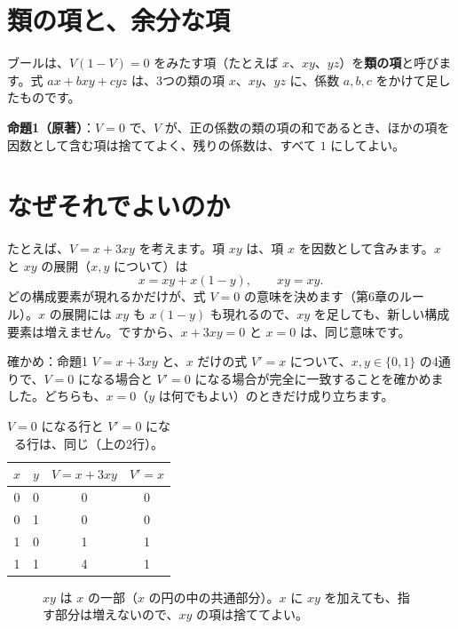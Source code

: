 \documentclass[a4paper,11pt,openany]{ltjsbook}
\begin{document}
\section{類の項と、余分な項}

ブールは、$V(1-V)=0$ をみたす項（たとえば $x$、$xy$、$yz$）を\textbf{類の項}と呼びます。式 $ax+bxy+cyz$ は、3つの類の項 $x$、$xy$、$yz$ に、係数 $a,b,c$ をかけて足したものです。

\textbf{命題1（原著）}：$V=0$ で、$V$ が、正の係数の類の項の和であるとき、ほかの項を因数として含む項は捨ててよく、残りの係数は、すべて $1$ にしてよい。

\section{なぜそれでよいのか}

たとえば、$V=x+3xy$ を考えます。項 $xy$ は、項 $x$ を因数として含みます。$x$ と $xy$ の展開（$x,y$ について）は
\[
x=xy+x(1-y),\qquad xy=xy .
\]
どの構成要素が現れるかだけが、式 $V=0$ の意味を決めます（第6章のルール）。$x$ の展開には $xy$ も $x(1-y)$ も現れるので、$xy$ を足しても、新しい構成要素は増えません。ですから、$x+3xy=0$ と $x=0$ は、同じ意味です。

\begin{examplebox}{確かめ：命題1}
$V=x+3xy$ と、$x$ だけの式 $V'=x$ について、$x,y\in\{0,1\}$ の4通りで、$V=0$ になる場合と $V'=0$ になる場合が完全に一致することを確かめました。どちらも、$x=0$（$y$ は何でもよい）のときだけ成り立ちます。
\end{examplebox}

\begin{table}[htbp]
\centering
\begin{tabular}{cc|cc}
\toprule
$x$ & $y$ & $V=x+3xy$ & $V'=x$\\
\midrule
0 & 0 & 0 & 0\\
0 & 1 & 0 & 0\\
1 & 0 & 1 & 1\\
1 & 1 & 4 & 1\\
\bottomrule
\end{tabular}
\caption{$V=0$ になる行と $V'=0$ になる行は、同じ（上の2行）。}
\end{table}

\begin{figure}[htbp]
\centering
{}
\caption{$xy$ は $x$ の一部（$x$ の円の中の共通部分）。$x$ に $xy$ を加えても、指す部分は増えないので、$xy$ の項は捨ててよい。}
\end{figure}
\end{document}
